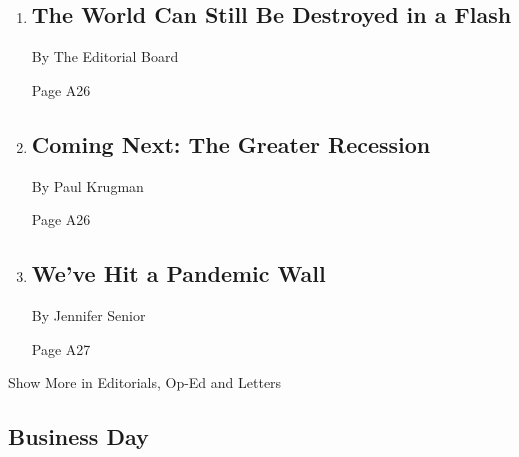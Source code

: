 \begin{enumerate}
\def\labelenumi{\arabic{enumi}.}
\item
  \href{/2020/08/06/opinion/hiroshima-anniversary-nuclear-weapons.html}{}

  \hypertarget{the-world-can-still-be-destroyed-in-a-flash}{%
  \subsection{The World Can Still Be Destroyed in a
  Flash}\label{the-world-can-still-be-destroyed-in-a-flash}}

  By The Editorial Board

  Page A26
\item
  \href{/2020/08/06/opinion/coronavirus-us-recession.html}{}

  \hypertarget{coming-next-the-greater-recession}{%
  \subsection{Coming Next: The Greater
  Recession}\label{coming-next-the-greater-recession}}

  By Paul Krugman

  Page A26
\item
  \href{/2020/08/05/opinion/coronavirus-mental-illness-depression.html}{}

  \hypertarget{weve-hit-a-pandemic-wall}{%
  \subsection{We've Hit a Pandemic
  Wall}\label{weve-hit-a-pandemic-wall}}

  By Jennifer Senior

  Page A27
\end{enumerate}

Show More in Editorials, Op-Ed and Letters

\hypertarget{business-day}{%
\subsection{Business Day}\label{business-day}}

